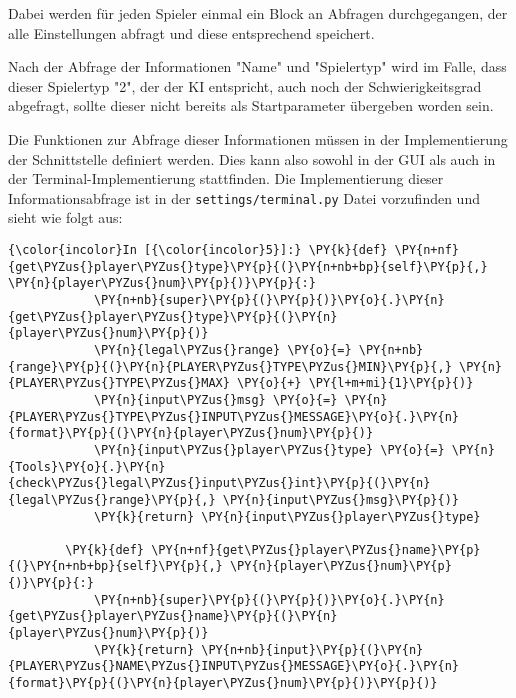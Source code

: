     Dabei werden für jeden Spieler einmal ein Block an Abfragen
durchgegangen, der alle Einstellungen abfragt und diese entsprechend
speichert.

Nach der Abfrage der Informationen "Name" und "Spielertyp" wird im
Falle, dass dieser Spielertyp "2", der der KI entspricht, auch
noch der Schwierigkeitsgrad abgefragt, sollte dieser nicht bereits als
Startparameter übergeben worden sein.

Die Funktionen zur Abfrage dieser Informationen müssen in der
Implementierung der Schnittstelle definiert werden. Dies kann also
sowohl in der GUI als auch in der Terminal-Implementierung stattfinden. Die
Implementierung dieser Informationsabfrage ist in der
\texttt{settings/terminal.py} Datei vorzufinden und sieht wie folgt aus:

    \begin{Verbatim}[commandchars=\\\{\}]
{\color{incolor}In [{\color{incolor}5}]:} \PY{k}{def} \PY{n+nf}{get\PYZus{}player\PYZus{}type}\PY{p}{(}\PY{n+nb+bp}{self}\PY{p}{,} \PY{n}{player\PYZus{}num}\PY{p}{)}\PY{p}{:}
            \PY{n+nb}{super}\PY{p}{(}\PY{p}{)}\PY{o}{.}\PY{n}{get\PYZus{}player\PYZus{}type}\PY{p}{(}\PY{n}{player\PYZus{}num}\PY{p}{)}
            \PY{n}{legal\PYZus{}range} \PY{o}{=} \PY{n+nb}{range}\PY{p}{(}\PY{n}{PLAYER\PYZus{}TYPE\PYZus{}MIN}\PY{p}{,} \PY{n}{PLAYER\PYZus{}TYPE\PYZus{}MAX} \PY{o}{+} \PY{l+m+mi}{1}\PY{p}{)}
            \PY{n}{input\PYZus{}msg} \PY{o}{=} \PY{n}{PLAYER\PYZus{}TYPE\PYZus{}INPUT\PYZus{}MESSAGE}\PY{o}{.}\PY{n}{format}\PY{p}{(}\PY{n}{player\PYZus{}num}\PY{p}{)}
            \PY{n}{input\PYZus{}player\PYZus{}type} \PY{o}{=} \PY{n}{Tools}\PY{o}{.}\PY{n}{check\PYZus{}legal\PYZus{}input\PYZus{}int}\PY{p}{(}\PY{n}{legal\PYZus{}range}\PY{p}{,} \PY{n}{input\PYZus{}msg}\PY{p}{)}
            \PY{k}{return} \PY{n}{input\PYZus{}player\PYZus{}type}
        
        \PY{k}{def} \PY{n+nf}{get\PYZus{}player\PYZus{}name}\PY{p}{(}\PY{n+nb+bp}{self}\PY{p}{,} \PY{n}{player\PYZus{}num}\PY{p}{)}\PY{p}{:}
            \PY{n+nb}{super}\PY{p}{(}\PY{p}{)}\PY{o}{.}\PY{n}{get\PYZus{}player\PYZus{}name}\PY{p}{(}\PY{n}{player\PYZus{}num}\PY{p}{)}
            \PY{k}{return} \PY{n+nb}{input}\PY{p}{(}\PY{n}{PLAYER\PYZus{}NAME\PYZus{}INPUT\PYZus{}MESSAGE}\PY{o}{.}\PY{n}{format}\PY{p}{(}\PY{n}{player\PYZus{}num}\PY{p}{)}\PY{p}{)}
        

\end{Verbatim}
